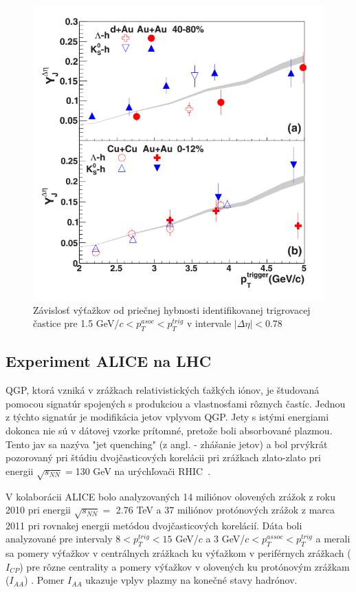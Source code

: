 \documentclass[thesismargins, thesislinespacing]{rnthesis}
\begin{document}
\begin{figure}[hbtp!]
	\centering
	\includegraphics[scale=0.5]{./Obrazky_praca/clanokstar.png}
	\caption{Závislosť výťažkov od priečnej hybnosti identifikovanej trigrovacej častice pre 1.5 GeV/$c <p_T^{asoc}<p_T^{trig}$ v intervale $|\Delta\eta|<0.78$ ~\cite{clanokstar}}
	\label{clanokstar}
\end{figure}

\subsection{Experiment ALICE na LHC}
QGP, ktorá vzniká v zrážkach relativistických ťažkých iónov, je študovaná pomocou signatúr spojených s produkciou a vlastnosťami rôznych častíc. Jednou z týchto signatúr je modifikácia jetov vplyvom QGP. Jety s istými energiami dokonca nie sú v dátovej vzorke prítomné, pretože boli absorbované plazmou. Tento jav sa nazýva "jet quenching" (z angl. - zhášanie jetov) a bol prvýkrát pozorovaný pri štúdiu dvoj\-čas\-ti\-co\-vých korelácii pri zrážkach zlato-zlato pri energii $\sqrt{s_{NN}}=$130 GeV na urýchľovači RHIC~\cite{rhic}.

V kolaborácii ALICE bolo analyzovaných 14 miliónov olovených zrážok z roku 2010 pri energii $\sqrt{s_{NN}}=$ 2.76 TeV a 37 miliónov protónových zrážok z marca 2011 pri rovnakej energii metódou dvojčasticových korelácií. Dáta boli analyzované pre intervaly $8<p^{trig}_{T}<15$ GeV/$c$ a 3 GeV/$c<p^{assoc}_{T}<p_T^{trig}$ a merali sa pomery výťažkov v centrálnych zrážkach ku výťažkom v periférnych zrážkach ($I_{CP}$) pre rôzne centrality a pomery výťažkov v olovených ku protónovým zrážkam ($I_{AA}$) \cite{clanok}. Pomer $I_{AA}$ ukazuje vplyv plazmy na konečné stavy hadrónov. 
\end{document}
